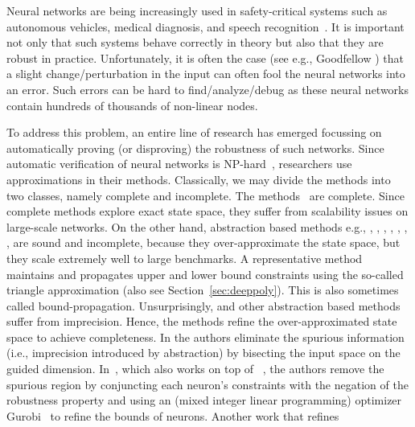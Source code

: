Neural networks are being increasingly used in safety-critical systems such as autonomous vehicles, medical diagnosis, and speech recognition~\cite{bojarski2016end,amato2013artificial,hinton2012deep}. It is important not only that such systems behave correctly in theory but also that they are robust in practice. Unfortunately, it is often the case (see e.g., Goodfellow \cite{goodfellow2014explaining}) that a slight change/perturbation in the input can often fool the neural networks into an error. Such errors can be hard to find/analyze/debug as these neural networks contain hundreds of thousands of non-linear nodes.

To address this problem, an entire line of research has emerged focussing on automatically proving (or disproving) the robustness of such networks. Since automatic verification of neural networks is NP-hard~\cite{katz2021reluplex}, researchers use approximations in their methods. Classically, we may divide the methods into two classes, namely complete and incomplete. The methods~\cite{lomuscio2017approach,fischetti2018deep,dutta2018output,cheng2017maximum,katz2017reluplex,katz2019marabou,ehlers2017formal,huang2017safety,wang2021beta,xu2020fast,zhang2022general} are complete. Since complete methods explore exact state space, they suffer from scalability issues on large-scale networks. On the other hand, abstraction based methods e.g., \cite{dvijotham2018dual}, \cite{gehr2018ai2}, \cite{singh2018fast},  \cite{singh2018boosting}, \cite{weng2018towards}, \cite{wong2018provable}, \cite{zhang2018efficient}, \cite{zhang2018efficient} are sound and incomplete, because they over-approximate the state space, but they scale extremely well to large benchmarks. A representative method \deeppoly{}~\cite{singh2019abstract} maintains and propagates upper and lower bound constraints using the so-called triangle approximation (also see Section~\ref{sec:deeppoly}). This is also sometimes called bound-propagation. %
Unsurprisingly, \deeppoly{} and other abstraction based methods suffer from imprecision. Hence, the methods \cite{wang2018formal,wang2018efficient,elboher2020abstraction,yang2021improving,lin2020art} refine the over-approximated state space to achieve completeness. In \cite{wang2018formal,wang2018efficient,lin2020art} the authors eliminate the spurious information (i.e., imprecision introduced by abstraction) by bisecting the input space on the guided dimension. In~\cite{yang2021improving}, which also works on top of \deeppoly{}~\cite{singh2019abstract}, the authors remove the spurious region by  conjuncting each neuron's constraints with the negation of the robustness property and using an \milp{} (mixed integer linear programming) optimizer Gurobi~\cite{gurobioptimizer} to refine the bounds of neurons. Another work that refines
